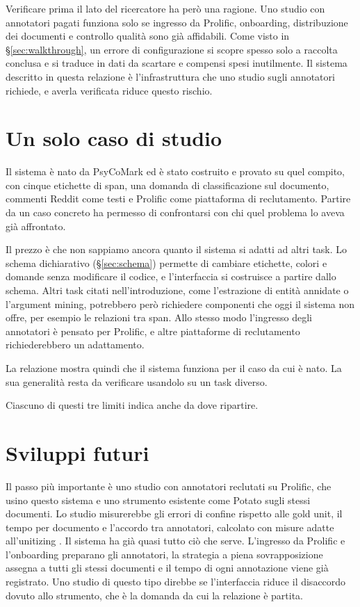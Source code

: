 \documentclass[]{sapthesis}
\begin{document}
Verificare prima il lato del ricercatore ha però una ragione. Uno studio con annotatori pagati funziona solo se ingresso da Prolific, onboarding, distribuzione dei documenti e controllo qualità sono già affidabili. Come visto in \S\ref{sec:walkthrough}, un errore di configurazione si scopre spesso solo a raccolta conclusa e si traduce in dati da scartare e compensi spesi inutilmente. Il sistema descritto in questa relazione è l'infrastruttura che uno studio sugli annotatori richiede, e averla verificata riduce questo rischio.

\section{Un solo caso di studio}
\label{sec:lim-caso}

Il sistema è nato da PsyCoMark ed è stato costruito e provato su quel compito, con cinque etichette di span, una domanda di classificazione sul documento, commenti Reddit come testi e Prolific come piattaforma di reclutamento. Partire da un caso concreto ha permesso di confrontarsi con chi quel problema lo aveva già affrontato.

Il prezzo è che non sappiamo ancora quanto il sistema si adatti ad altri task. Lo schema dichiarativo (\S\ref{sec:schema}) permette di cambiare etichette, colori e domande senza modificare il codice, e l'interfaccia si costruisce a partire dallo schema. Altri task citati nell'introduzione, come l'estrazione di entità annidate o l'argument mining, potrebbero però richiedere componenti che oggi il sistema non offre, per esempio le relazioni tra span. Allo stesso modo l'ingresso degli annotatori è pensato per Prolific, e altre piattaforme di reclutamento richiederebbero un adattamento.

La relazione mostra quindi che il sistema funziona per il caso da cui è nato. La sua generalità resta da verificare usandolo su un task diverso.

Ciascuno di questi tre limiti indica anche da dove ripartire.

\section{Sviluppi futuri}
\label{sec:sviluppi}

Il passo più importante è uno studio con annotatori reclutati su Prolific, che usino questo sistema e uno strumento esistente come Potato sugli stessi documenti. Lo studio misurerebbe gli errori di confine rispetto alle gold unit, il tempo per documento e l'accordo tra annotatori, calcolato con misure adatte all'unitizing \parencite{krippendorff2016unitizing}. Il sistema ha già quasi tutto ciò che serve. L'ingresso da Prolific e l'onboarding preparano gli annotatori, la strategia a piena sovrapposizione assegna a tutti gli stessi documenti e il tempo di ogni annotazione viene già registrato. Uno studio di questo tipo direbbe se l'interfaccia riduce il disaccordo dovuto allo strumento, che è la domanda da cui la relazione è partita.
\end{document}

